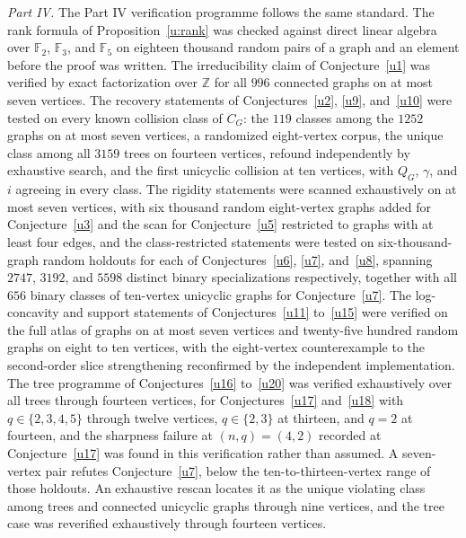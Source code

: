 \documentclass[11pt]{article}
\theoremstyle{definition}
\newcommand{\Fq}{\mathbb F}
\newcommand{\Z}{\mathbb Z}
\providecommand{\Z}{\mathbb Z}
\begin{document}
\emph{Part IV.}  The Part IV verification programme follows the same standard.  The rank formula of Proposition~\ref{u:rank} was checked against direct linear algebra over $\Fq_2$, $\Fq_3$, and $\Fq_5$ on eighteen thousand random pairs of a graph and an element before the proof was written.  The irreducibility claim of Conjecture~\ref{u1} was verified by exact factorization over $\Z$ for all $996$ connected graphs on at most seven vertices.  The recovery statements of Conjectures~\ref{u2}, \ref{u9}, and~\ref{u10} were tested on every known collision class of $C_G$: the $119$ classes among the $1252$ graphs on at most seven vertices, a randomized eight-vertex corpus, the unique class among all $3159$ trees on fourteen vertices, refound independently by exhaustive search, and the first unicyclic collision at ten vertices, with $Q_G$, $\gamma$, and $i$ agreeing in every class.  The rigidity statements were scanned exhaustively on at most seven vertices, with six thousand random eight-vertex graphs added for Conjecture~\ref{u3} and the scan for Conjecture~\ref{u5} restricted to graphs with at least four edges, and the class-restricted statements were tested on six-thousand-graph random holdouts for each of Conjectures~\ref{u6}, \ref{u7}, and~\ref{u8}, spanning $2747$, $3192$, and $5598$ distinct binary specializations respectively, together with all $656$ binary classes of ten-vertex unicyclic graphs for Conjecture~\ref{u7}.  The log-concavity and support statements of Conjectures~\ref{u11} to~\ref{u15} were verified on the full atlas of graphs on at most seven vertices and twenty-five hundred random graphs on eight to ten vertices, with the eight-vertex counterexample to the second-order slice strengthening reconfirmed by the independent implementation.  The tree programme of Conjectures~\ref{u16} to~\ref{u20} was verified exhaustively over all trees through fourteen vertices, for Conjectures~\ref{u17} and~\ref{u18} with $q\in\{2,3,4,5\}$ through twelve vertices, $q\in\{2,3\}$ at thirteen, and $q=2$ at fourteen, and the sharpness failure at $(n,q)=(4,2)$ recorded at Conjecture~\ref{u17} was found in this verification rather than assumed.  A seven-vertex pair refutes Conjecture~\ref{u7}, below the ten-to-thirteen-vertex range of those holdouts.  An exhaustive rescan locates it as the unique violating class among trees and connected unicyclic graphs through nine vertices, and the tree case was reverified exhaustively through fourteen vertices.
\end{document}

